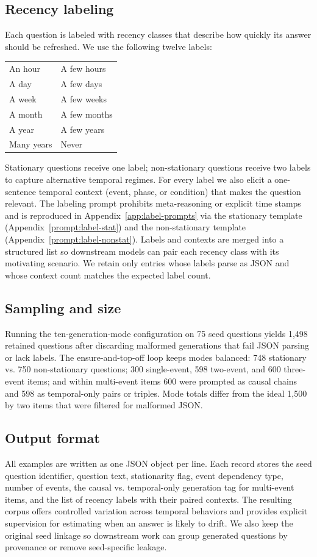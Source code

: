 \subsection{Recency labeling}
Each question is labeled with recency classes that describe how quickly its answer should be refreshed. We use the following twelve labels:
\begin{center}
    \begin{tabular}{ll}
    An hour & A few hours \\
    A day & A few days \\
    A week & A few weeks \\
    A month & A few months \\
    A year & A few years \\
    Many years & Never
    \end{tabular}
\end{center}
Stationary questions receive one label; non-stationary questions receive two labels to capture alternative temporal regimes. For every label we also elicit a one-sentence temporal context (event, phase, or condition) that makes the question relevant. The labeling prompt prohibits meta-reasoning or explicit time stamps and is reproduced in Appendix~\ref{app:label-prompts} via the stationary template (Appendix~\ref{prompt:label-stat}) and the non-stationary template (Appendix~\ref{prompt:label-nonstat}). Labels and contexts are merged into a structured list so downstream models can pair each recency class with its motivating scenario. We retain only entries whose labels parse as JSON and whose context count matches the expected label count.

\subsection{Sampling and size}
Running the ten-generation-mode configuration on 75 seed questions yields 1{,}498 retained questions after discarding malformed generations that fail JSON parsing or lack labels. The ensure-and-top-off loop keeps modes balanced: 748 stationary vs. 750 non-stationary questions; 300 single-event, 598 two-event, and 600 three-event items; and within multi-event items 600 were prompted as causal chains and 598 as temporal-only pairs or triples. Mode totals differ from the ideal 1{,}500 by two items that were filtered for malformed JSON.

\subsection{Output format}
All examples are written as one JSON object per line. Each record stores the seed question identifier, question text, stationarity flag, event dependency type, number of events, the causal vs. temporal-only generation tag for multi-event items, and the list of recency labels with their paired contexts. The resulting corpus offers controlled variation across temporal behaviors and provides explicit supervision for estimating when an answer is likely to drift. We also keep the original seed linkage so downstream work can group generated questions by provenance or remove seed-specific leakage.

